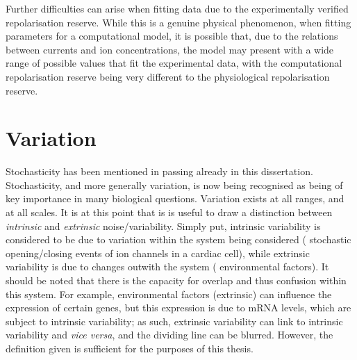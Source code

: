\documentclass[../thesis-main.tex]{subfiles}
\begin{document}
Further difficulties can arise when fitting data due to the experimentally verified repolarisation reserve. While this is a genuine physical phenomenon, when fitting parameters for a computational model, it is possible that, due to the relations between currents and ion concentrations, the model may present with a wide range of possible values that fit the experimental data, with the computational repolarisation reserve being very different to the physiological repolarisation reserve.

\section{Variation}
\label{sec:param-var}
Stochasticity has been mentioned in passing already in this dissertation. Stochasticity, and more generally variation, is now being recognised as being of key importance in many biological questions. Variation exists at all ranges, and at all scales. It is at this point that is is useful to draw a distinction between \emph{intrinsic} and \emph{extrinsic} noise/variability. Simply put, intrinsic variability is considered to be due to variation within the system being considered (\eg{} stochastic opening/closing events of ion channels in a cardiac cell), while extrinsic variability is due to changes outwith the system (\eg{} environmental factors). It should be noted that there is the capacity for overlap and thus confusion within this system. For example, environmental factors (extrinsic) can influence the expression of certain genes, but this expression is due to mRNA levels, which are subject to intrinsic variability; as such, extrinsic variability can link to intrinsic variability and \emph{vice versa}, and the dividing line can be blurred. However, the definition given is sufficient for the purposes of this thesis.


\end{document}
